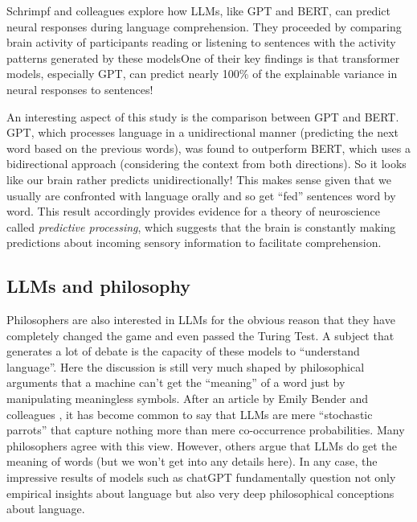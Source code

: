Schrimpf and colleagues \cite{schrimpf2021neural} explore how LLMs, like GPT and BERT, can predict neural responses during language comprehension. They proceeded by comparing  brain activity of participants reading or listening to sentences with the activity patterns generated by these modelsOne of their key findings is that transformer models, especially GPT, can predict nearly 100\% of the explainable variance in neural responses to sentences! 

An interesting aspect of this study is the comparison between GPT and BERT. GPT, which processes language in a unidirectional manner (predicting the next word based on the previous words), was found to outperform BERT, which uses a bidirectional approach (considering the context from both directions). So it looks like our brain rather predicts unidirectionally! This makes sense given that we usually are confronted with language orally and so get ``fed'' sentences word by word. This result accordingly provides evidence for a theory of neuroscience called \emph{predictive processing}, which suggests that the brain is constantly making predictions about incoming sensory information to facilitate comprehension.

\subsection{LLMs and philosophy}

%

Philosophers are also interested in LLMs for the obvious reason that they have completely changed the game and even passed the Turing Test. A subject that generates a lot of debate is the capacity of these models to ``understand language''. Here the discussion is still very much shaped by philosophical arguments that a machine can’t get the ``meaning'' of a word just by manipulating meaningless symbols. After an article by Emily Bender and colleagues \cite{bender2021dangers}, it has become common to say that LLMs are mere ``stochastic parrots'' that capture nothing more than mere co-occurrence probabilities. Many philosophers agree with this view. However, others argue that LLMs do get the meaning of words (but we won’t get into any details here). In any case, the impressive results of models such as chatGPT fundamentally question not only empirical insights about language but also very deep philosophical conceptions about language.

